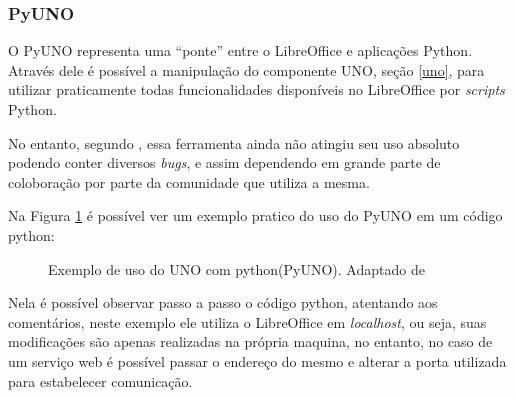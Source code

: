 \subsubsection{PyUNO}

O PyUNO representa uma ``ponte'' entre o LibreOffice e aplicações Python. Através dele é possível a manipulação do componente UNO, seção \ref{uno}, para utilizar praticamente todas funcionalidades disponíveis no LibreOffice por \textit{scripts} Python.

No entanto, segundo \cite{PYUNO}, essa ferramenta ainda não atingiu seu uso absoluto podendo conter diversos \textit{bugs}, e assim dependendo em grande parte de coloboração por parte da comunidade que utiliza a mesma.

Na Figura \ref{exemple_uno} é possível ver um exemplo pratico do uso do PyUNO em um código python:

\begin{figure}[ht]
    \centering
    \caption{Exemplo de uso do UNO com python(PyUNO). Adaptado de \cite{MINETTO-PYUNO}}
    \label{exemple_uno}
\end{figure}

Nela é possível observar passo a passo o código python, atentando aos comentários, neste exemplo ele utiliza o LibreOffice em \textit{localhost}, ou seja, suas modificações são apenas realizadas na própria maquina, no entanto, no caso de um serviço web é possível passar o endereço do mesmo e alterar a porta utilizada para estabelecer comunicação.

